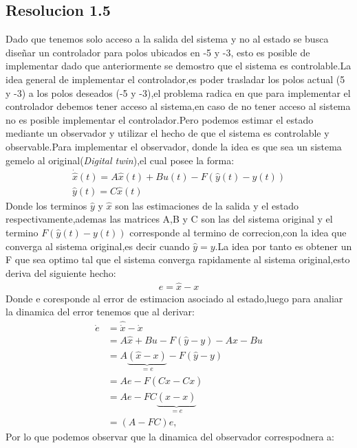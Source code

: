 \documentclass[
  11pt,
  letterpaper,
   addpoints,
  ]{exam}
\begin{document}
\begin{questions}
\begin{solution}
    \subsection*{Resolucion 1.5}
    Dado que tenemos solo acceso a la salida del sistema y no al estado se busca diseñar un controlador para polos ubicados en -5 y -3, esto es posible de implementar dado que anteriormente se demostro que el sistema es controlable.La idea general de implementar el controlador,es poder trasladar los polos actual (5 y -3) a los polos deseados (-5 y -3),el problema radica en que para implementar el controlador debemos tener acceso al sistema,en caso de no tener acceso al sistema no es posible implementar el controlador.Pero podemos estimar el estado mediante un observador y utilizar el hecho de que el sistema es controlable y observable.Para implementar el observador, donde la idea es que sea un sistema gemelo al original(\textit{Digital twin}),el cual posee la forma:
    \begin{align}
        \dot{\hat{x}}(t) = A\hat{x}(t) + Bu(t) - F(\hat{y}(t)-y(t))\\
        \hat{y}(t) = C\hat{x}(t)
    \end{align}
    Donde los terminos $\hat{y}$ y $\hat{x}$ son las estimaciones de la salida y el estado respectivamente,ademas las matrices A,B y C son las del sistema original y el termino $F(\hat{y}(t)-y(t))$ corresponde al termino de correcion,con la idea que converga al sistema original,es decir cuando $\hat{y}=y$.La idea por tanto es obtener un F que sea optimo tal que el sistema converga rapidamente al sistema original,esto deriva del siguiente hecho:
    \begin{align}
        e=\hat{x}-x
    \end{align}
    Donde e coresponde al error de estimacion asociado al estado,luego para analiar la dinamica del error tenemos que al derivar:
    \begin{align}
        \dot{e} &= \hat{\dot{x}} - \dot{x} \\
                &= A \hat{x} + Bu - F (\hat{y} - y) - A x - Bu \\
                &= A \underbrace{(\hat{x} - x)}_{=e} - F (\hat{y} - y) \\
                &= A e - F \left( C \hat{x} - C x \right) \\
                &= A e - FC \underbrace{(\hat{x} - x)}_{=e} \\
                &= (A - FC) e,
        \end{align}
    Por lo que podemos observar que la dinamica del observador correspodnera a:

\end{solution}
\end{questions}
\end{document}
